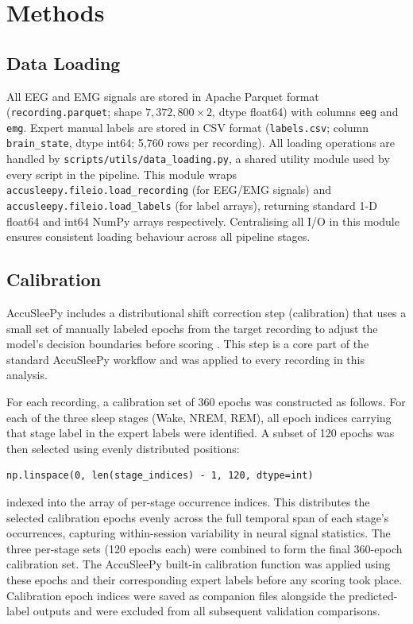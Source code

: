 \documentclass[12pt,a4paper]{article}
\begin{document}
\section{Methods}

\subsection{Data Loading}

All EEG and EMG signals are stored in Apache Parquet format
(\texttt{recording.parquet}; shape $7{,}372{,}800 \times 2$, dtype float64)
with columns \texttt{eeg} and \texttt{emg}. Expert manual labels are stored in
CSV format (\texttt{labels.csv}; column \texttt{brain\_state}, dtype int64;
5,760 rows per recording). All loading operations are handled by
\texttt{scripts/utils/data\_loading.py}, a shared utility module used by
every script in the pipeline. This module wraps
\texttt{accusleepy.fileio.load\_recording} (for EEG/EMG signals) and
\texttt{accusleepy.fileio.load\_labels} (for label arrays), returning
standard 1-D float64 and int64 NumPy arrays respectively. Centralising all
I/O in this module ensures consistent loading behaviour across all pipeline
stages.

\subsection{Calibration}

AccuSleePy includes a distributional shift correction step (calibration) that
uses a small set of manually labeled epochs from the target recording to adjust
the model's decision boundaries before scoring \citep{Barger2019}. This step
is a core part of the standard AccuSleePy workflow and was applied to every
recording in this analysis.

For each recording, a calibration set of 360 epochs was constructed as follows.
For each of the three sleep stages (Wake, NREM, REM), all epoch indices carrying
that stage label in the expert labels were identified. A subset of 120 epochs
was then selected using evenly distributed positions:

\begin{verbatim}
np.linspace(0, len(stage_indices) - 1, 120, dtype=int)
\end{verbatim}

indexed into the array of per-stage occurrence indices. This distributes the
selected calibration epochs evenly across the full temporal span of each stage's
occurrences, capturing within-session variability in neural signal statistics.
The three per-stage sets (120 epochs each) were combined to form the final
360-epoch calibration set. The AccuSleePy built-in calibration function was
applied using these epochs and their corresponding expert labels before any
scoring took place. Calibration epoch indices were saved as companion files
alongside the predicted-label outputs and were excluded from all subsequent
validation comparisons.
\end{document}
